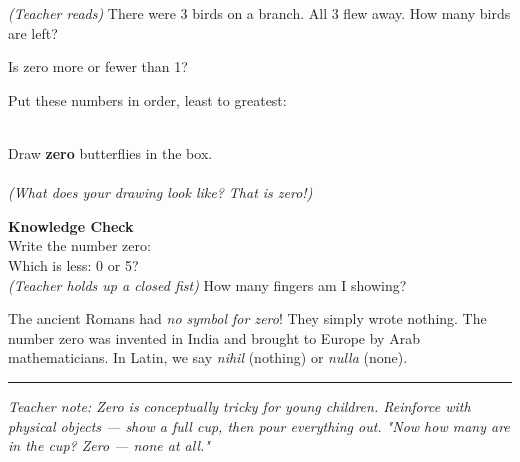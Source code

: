 \documentclass[12pt,letterpaper]{article}
\begin{document}
\vspace{10pt}
\prob \textit{(Teacher reads)} There were 3 birds on a branch.
All 3 flew away. How many birds are left? \quad\ansblank

\vspace{10pt}
\prob Is zero more or fewer than 1? \quad\ansblank

\vspace{10pt}
\prob Put these numbers in order, least to greatest:\\[6pt]
\hspace{2cm}{\Large 3 \quad 0 \quad 1 \quad 2}\\[6pt]
\hspace{2cm}\ansblank\quad\ansblank\quad\ansblank\quad\ansblank

\vspace{10pt}
\prob Draw \textbf{zero} butterflies in the box.\\[4pt]
\noindent\fbox{\rule{0pt}{2cm}\hspace{11cm}}\\[4pt]
\textit{(What does your drawing look like? That is zero!)}

\goldrule

\begin{checkbox}
\noindent\textbf{\color{sd-green}Knowledge Check}\\[4pt]
\setcounter{probnum}{0}
\prob Write the number zero: \quad\ansblank\\[8pt]
\prob Which is less: 0 or 5? \quad\ansblank\\[8pt]
\prob \textit{(Teacher holds up a closed fist)} How many fingers am I showing? \quad\ansblank
\end{checkbox}

\vfill
{}
The ancient Romans had \textit{no symbol for zero}!
They simply wrote nothing.
The number zero was invented in India and brought to Europe by Arab mathematicians.
In Latin, we say \textit{nihil} (nothing) or \textit{nulla} (none).

\vspace{4pt}\hrule\vspace{3pt}
{\footnotesize\color{gray}\textit{Teacher note: Zero is conceptually tricky for young children.
  Reinforce with physical objects — show a full cup, then pour everything out.
  "Now how many are in the cup? Zero — none at all."}}
\end{document}
